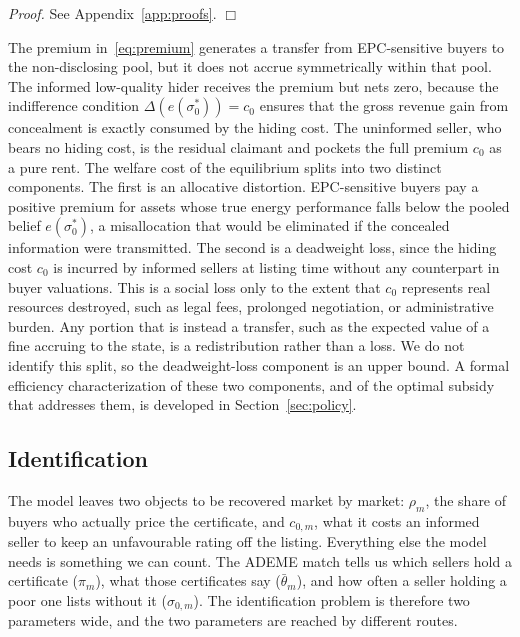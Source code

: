 \noindent\textit{Proof.} See Appendix~\ref{app:proofs}. $\Box$

The premium in~\eqref{eq:premium} generates a transfer from EPC-sensitive buyers to the non-disclosing pool, but it does not accrue symmetrically within that pool. The informed low-quality hider receives the premium but nets zero, because the indifference condition $\Delta(e(\sigma_0^*))=c_0$ ensures that the gross revenue gain from concealment is exactly consumed by the hiding cost. The uninformed seller, who bears no hiding cost, is the residual claimant and pockets the full premium $c_0$ as a pure rent. The welfare cost of the equilibrium splits into two distinct components. The first is an allocative distortion. EPC-sensitive buyers pay a positive premium for assets whose true energy performance falls below the pooled belief $e(\sigma_0^*)$, a misallocation that would be eliminated if the concealed information were transmitted. The second is a deadweight loss, since the hiding cost $c_0$ is incurred by informed sellers at listing time without any counterpart in buyer valuations. This is a social loss only to the extent that $c_0$ represents real resources destroyed, such as legal fees, prolonged negotiation, or administrative burden. Any portion that is instead a transfer, such as the expected value of a fine accruing to the state, is a redistribution rather than a loss. We do not identify this split, so the deadweight-loss component is an upper bound. A formal efficiency characterization of these two components, and of the optimal subsidy that addresses them, is developed in Section~\ref{sec:policy}.

\subsection{Identification}
\label{sec:identification}

The model leaves two objects to be recovered market by market: $\rho_m$, the share of buyers who actually price the certificate, and $c_{0,m}$, what it costs an informed seller to keep an unfavourable rating off the listing. Everything else the model needs is something we can count. The ADEME match tells us which sellers hold a certificate ($\pi_m$), what those certificates say ($\bar\theta_m$), and how often a seller holding a poor one lists without it ($\sigma_{0,m}$). The identification problem is therefore two parameters wide, and the two parameters are reached by different routes.

